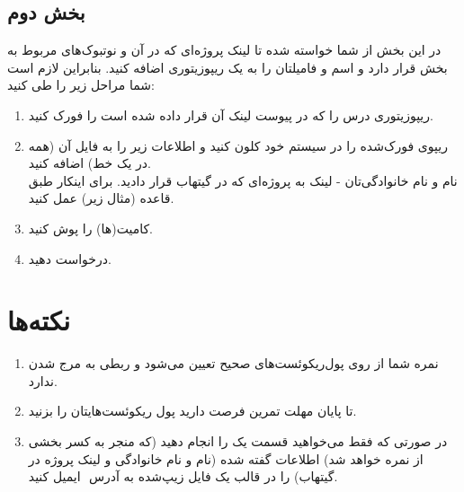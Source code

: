 \documentclass{article}
\begin{document}
\subsection{بخش دوم}
در این بخش از شما خواسته شده تا لینک پروژه‌ای که در آن و نوتبوک‌های مربوط به بخش    قرار دارد و اسم و فامیلتان را به یک ریپوزیتوری اضافه کنید.
بنابراین لازم است شما مراحل زیر را طی کنید:
\begin{enumerate}
    \item ریپوزیتوری درس را که در پیوست لینک آن قرار داده شده است را فورک کنید.
    \item ریپوی فورک‌شده را در سیستم خود کلون کنید و اطلاعات زیر را به فایل  آن (همه در یک خط) اضافه کنید.\\
    نام و نام خانوادگی‌تان - لینک به پروژه‌ای که در گیتهاب قرار دادید.
    برای اینکار طبق قاعده (مثال زیر) عمل کنید.
    \lr{}
    \item کامیت‌(ها) را پوش کنید.
    \item درخواست  دهید.    
\end{enumerate}

\section{نکته‌ها}
\begin{enumerate}
    \item نمره شما از روی پول‌ریکوئست‌های صحیح تعیین می‌شود و ربطی به مرج شدن ندارد.
    \item تا پایان مهلت تمرین فرصت دارید پول ریکوئست‌هایتان را بزنید.
    \item در صورتی که فقط می‌خواهید قسمت یک را انجام دهید (که منجر به کسر بخشی از نمره خواهد شد) اطلاعات گفته شده (نام و نام خانوادگی و لینک پروژه در گیتهاب) را در قالب یک فایل  زیپ‌شده به آدرس ‌‌‌‌ ایمیل کنید.
\end{enumerate}

\end{document}
